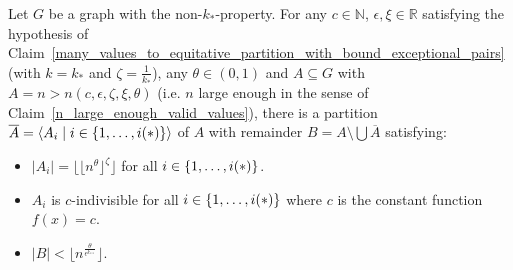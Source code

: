     \theorem[Theorem 4.23]
        Let $G$ be a graph with the non-$k_*$-property.
        For any $c \in \mathbb{N}$, $\epsilon, \xi \in \mathbb{R}$ satisfying the hypothesis of Claim~\ref{many_values_to_equitative_partition_with_bound_exceptional_pairs}
        (with $k = k_*$ and $\zeta = \frac{1}{k_*}$), any $\theta \in (0,1)$ and $A \subseteq G$ with
        $A = n > n\left( c, \epsilon, \zeta, \xi, \theta \right)$ (i.e. $n$ large enough in the sense of Claim~\ref{n_large_enough_valid_values}),
        there is a partition $\overline{A} = \left< A_i \mid i \in \left\{ 1, \dots, i(*) \right\} \right>$ of $A$ with remainder $B = A \setminus \bigcup \overline{A}$
        satisfying:
        \begin{itemize}
            \item $|A_i| = \lfloor \lfloor n^\theta \rfloor ^\zeta \rfloor$ for all $i \in \left\{ 1, \dots, i(*) \right\}$.
            \item $A_i$ is $c$-indivisible for all $i \in \left\{ 1, \dots, i(*) \right\}$ where $c$ is the constant function $f(x) = c$.
            \item $|B| < \lfloor n^{\frac{\theta}{\epsilon^{k_{**}}}} \rfloor$.
        \end{itemize}
